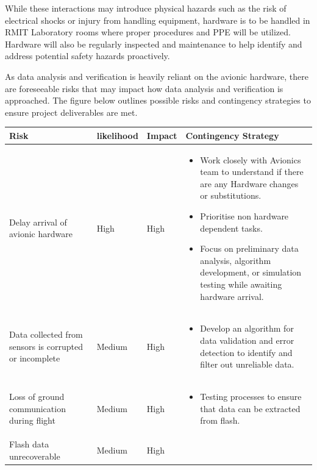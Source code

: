 While these interactions may introduce physical hazards such as the risk of electrical shocks or injury from handling equipment, hardware is to be handled in RMIT Laboratory rooms where proper procedures and PPE will be utilized. Hardware will also be regularly inspected and maintenance to help identify and address potential safety hazards proactively.  

As data analysis and verification is heavily reliant on the avionic hardware, there are foreseeable risks that may impact how data analysis and verification is approached. The figure below outlines possible risks and contingency strategies to ensure project deliverables are met.  

\begin{table}[]
\centering
\begin{tabular}{>{\raggedright}p{4cm}p{1.5cm}p{1.5cm}p{7cm}}
\toprule
\textbf{Risk} & \textbf{likelihood} & \textbf{Impact} & \textbf{Contingency Strategy} \\ \midrule
Delay arrival of avionic hardware & High & High & \vspace{-1.5em}
\begin{itemize}[leftmargin=*]
  \item Work closely with Avionics team to understand if there are any Hardware changes or substitutions.
  \item Prioritise non hardware dependent tasks.
  \item Focus on preliminary data analysis, algorithm development, or simulation testing while awaiting hardware arrival.
\end{itemize}\\\midrule
Data collected from sensors is corrupted or incomplete & Medium & High & \vspace{-1.5em}
\begin{itemize}[leftmargin=*]
  \item Develop an algorithm for data validation and error detection to identify and filter out unreliable data.
\end{itemize}\\\midrule
Loss of ground communication during flight & Medium & High & \vspace{-1.5em}
\begin{itemize}[leftmargin=*]
  \item Testing processes to ensure that data can be extracted from flash.
\end{itemize}\\\midrule
Flash data unrecoverable & Medium & High & \vspace{-1.5em}

\end{tabular}
\end{table}
